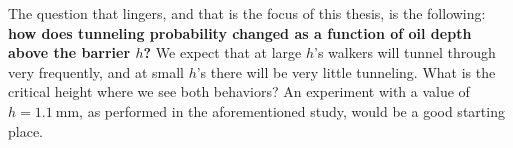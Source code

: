 The question that lingers, and that is the focus of this thesis, is the following: \textbf{how does tunneling probability changed as a function of oil depth above the barrier $h$?} We expect that at large $h$'s walkers will tunnel through very frequently, and at small $h$'s there will be very little tunneling. What is the critical height where we see both behaviors? An experiment with a value of $h = 1.1~\mathrm{mm}$, as performed in the aforementioned study, would be a good starting place. 